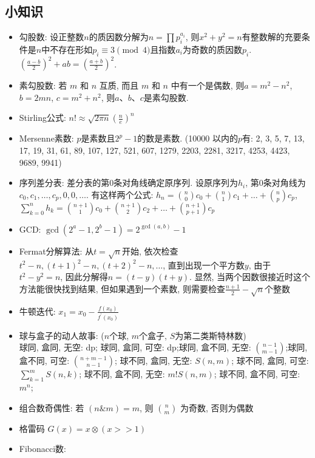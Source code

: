 \documentclass[landscape,a4paper]{article}
\begin{document}
\begin{spacing}{0.3}
\begin{multicols}{2}
\subsection{小知识}
\begin{itemize}
\item 勾股数: 设正整数$n$的质因数分解为$n = \prod p_i ^ {a_i}$,
  则$x^2+y^2=n$有整数解的充要条件是$n$中不存在形如$p_i \equiv 3\pmod{4}$且指数$a_i$为奇数的质因数$p_i$.
  $(\frac{a - b}{2})^2 + ab = (\frac{a + b}{2})^2$.
\item 素勾股数: 若 $m$ 和 $n$ 互质, 而且 $m$ 和 $n$ 中有一个是偶数, 则$a = m^2 - n^2$, $b = 2mn$, $c = m^2 + n^2$, 则$a$、$b$、$c$是素勾股数.
\item Stirling公式: $n! \approx \sqrt{2 \pi n} (\frac{n}{e})^n$
\item Mersenne素数: $p$是素数且$2^p-1$的数是素数. (10000 以内的$p$有: 2, 3, 5, 7, 13, 17, 19, 31, 61, 89, 107, 127, 521, 607, 1279, 2203, 2281, 3217, 4253, 4423, 9689, 9941)
\item 序列差分表: 差分表的第$0$条对角线确定原序列.
  设原序列为$h_i$, 第$0$条对角线为$c_0,c_1,\ldots,c_p,0,0,\ldots$.
  有这样两个公式:
  $h_n = \binom{n}{0}c_0 + \binom{n}{1}c_1 + \ldots + \binom{n}{p} c_p$,
  $\sum_{k = 0}^{n}h_k = \binom{n+1}{1}c_0 + \binom{n+1}{2}c_2 + \ldots + \binom{n+1}{p+1}c_p$
\item GCD:
  $\gcd(2^a-1,2^b-1)=2^{\gcd(a,b)}-1$
\item Fermat分解算法:
  从$t=\sqrt{n}$开始,
  依次检查$t^2-n,(t+1)^2-n,(t+2)^2-n,\ldots$,
  直到出现一个平方数$y$,
  由于$t ^ 2 - y ^ 2 = n$,
  因此分解得$n = (t -y)(t + y)$.
  显然, 当两个因数很接近时这个方法能很快找到结果,
  但如果遇到一个素数, 则需要检查$\frac{n + 1}{2} - \sqrt{n}$个整数
\item 牛顿迭代:
  $x_1 = x_0 - \frac{f(x_0)}{f^\prime(x_0)}$
\item 球与盒子的动人故事: ($n$个球, $m$个盒子, $S$为第二类斯特林数)\\
 球同, 盒同, 无空: dp; 球同, 盒同, 可空: dp;球同, 盒不同, 无空: $\binom{n - 1}{m - 1}$;球同, 盒不同, 可空: $\binom{n + m - 1}{n - 1}$;
      球不同, 盒同, 无空: $S(n, m)$;
      球不同, 盒同, 可空: $\sum_{k = 1}^{m} S(n, k)$;
      球不同, 盒不同, 无空: $m! S(n, m)$;
      球不同, 盒不同, 可空: $m^n$;
\item 组合数奇偶性: 若 $(n \& m) = m$, 则 $\binom{n}{m}$ 为奇数, 否则为偶数
\item 格雷码 $G(x) = x \otimes (x >> 1) $
\item Fibonacci数:
  \begin{itemize}

\end{itemize}
\end{itemize}
\end{multicols}
\end{spacing}
\end{document}
